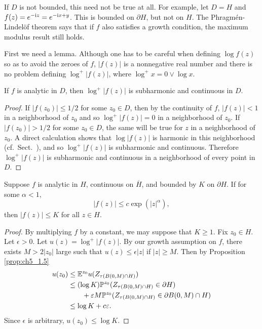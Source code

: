 
If $D$ is not bounded, this need not be true at all. For example, let $D = H$ and $f(z) = e^{-\mathrm{i} z} = e^{-\mathrm{i} x+y}$. This is bounded on $\partial H$, but not on $H$. The Phragm\'en-Lindel\"of theorem says that if $f$ also satisfies a growth condition, the maximum modulus result still holds.

First we need a lemma. Although one has to be careful when defining $\log f(z)$ so as to avoid the zeroes of $f$, $|f(z)|$ is a nonnegative real number and there is no problem defining $\log^+ |f(z)|$, where $\log^+ x = 0 \vee \log x$.


\begin{lemma}\label{lem:ch5_1.7}
If $f$ is analytic in $D$, then $\log^+ |f(z)|$ is subharmonic and continuous in $D$.
\end{lemma}

\begin{proof}
If $|f(z_0)| \leq 1/2$ for some $z_0 \in D$, then by the continuity of $f$, $|f(z)| < 1$ in a neighborhood of $z_0$ and so $\log^+ |f(z)| = 0$ in a neighborhood of $z_0$. If $|f(z_0)| > 1/2$ for some $z_0 \in D$, the same will be true for $z$ in a neighborhood of $z_0$. A direct calculation shows that $\log |f(z)|$ is harmonic in this neighborhood (cf.\ Sect.\ ), and so $\log^+ |f(z)|$ is subharmonic and continuous. Therefore $\log^+ |f(z)|$ is subharmonic and continuous in a neighborhood of every point in $D$.
\end{proof}

\begin{theorem}\label{thm:ch5_1.8}
Suppose $f$ is analytic in $H$, continuous on $\overline{H}$, and bounded by $K$ on $\partial H$. If for some $\alpha < 1$,
\[
    |f(z)| \leq c\exp(|z|^\alpha),
\]
then $|f(z)| \leq K$ for all $z \in H$.
\end{theorem}

\begin{proof}
By multiplying $f$ by a constant, we may suppose that $K \geq 1$. Fix $z_0 \in H$. Let $\epsilon > 0$. Let $u(z) = \log^+ |f(z)|$. By our growth assumption on $f$, there exists $M > 2|z_0|$ large such that $u(z) \leq \epsilon|z|$ if $|z| \geq M$. Then by Proposition \ref{prop:ch5_1.5}
\begin{align*}
    u(z_0) &\leq \mathbb{E}^{z_0} u(Z_{\tau(B(0,M)\cap H)}) \\
    &\leq (\log K)\mathbb{P}^{z_0}(Z_{\tau(B(0,M)\cap H)} \in \partial H) \\
    &\qquad+ \varepsilon M\mathbb{P}^{z_0}(Z_{\tau(B(0,M)\cap H)} \in \partial B(0,M) \cap H) \\
    &\leq \log K + c\varepsilon.
\end{align*}
    Since $\epsilon$ is arbitrary, $u(z_0) \leq \log K$.
\end{proof}

